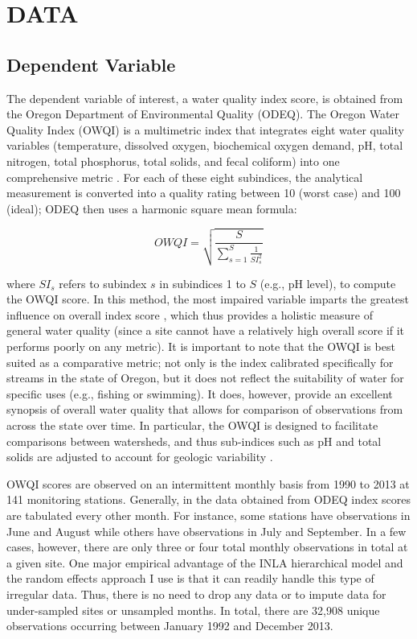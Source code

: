 \documentclass[12pt,a4paper,titlepage]{article}
\begin{document}
\section*{\bf\MakeUppercase{Data}}

\subsection*{Dependent Variable}
The dependent variable of interest, a water quality index score, is obtained from the Oregon Department of Environmental Quality (ODEQ). The Oregon Water Quality Index (OWQI) is a multimetric index that integrates eight water quality variables (temperature, dissolved oxygen, biochemical oxygen demand, pH, total nitrogen, total phosphorus, total solids, and fecal coliform) into one comprehensive metric \parencite{cude2001}. For each of these eight subindices, the analytical measurement is converted into a quality rating between 10 (worst case) and 100 (ideal); ODEQ then uses a harmonic square mean formula:

\begin{equation}
OWQI = \sqrt{\frac{S}{\sum_{s=1}^{S}\frac{1}{SI^{2}_{s}}}}
\label{eq:owqi}
\end{equation}

\noindent
where $SI_s$ refers to subindex $s$ in subindices 1 to $S$ (e.g., pH level), to compute the OWQI score. In this method, the most impaired variable imparts the greatest influence on overall index score \parencite{cude2001}, which thus provides a holistic measure of general water quality (since a site cannot have a relatively high overall score if it performs poorly on any metric). It is important to note that the OWQI is best suited as a comparative metric; not only is the index calibrated specifically for streams in the state of Oregon, but it does not reflect the suitability of water for specific uses (e.g., fishing or swimming). It does, however, provide an excellent synopsis of overall water quality that allows for comparison of observations from across the state over time. In particular, the OWQI is designed to facilitate comparisons between watersheds, and thus sub-indices such as pH and total solids are adjusted to account for geologic variability \parencite{cude2001}.

OWQI scores are observed on an intermittent monthly basis from 1990 to 2013 at 141 monitoring stations. Generally, in the data obtained from ODEQ index scores are tabulated every other month. For instance, some stations have observations in June and August while others have observations in July and September. In a few cases, however, there are only three or four total monthly observations in total at a given site. One major empirical advantage of the INLA hierarchical model and the random effects approach I use is that it can readily handle this type of irregular data. Thus, there is no need to drop any data or to impute data for under-sampled sites or unsampled months. In total, there are 32,908 unique observations occurring between January 1992 and December 2013.
\end{document}
